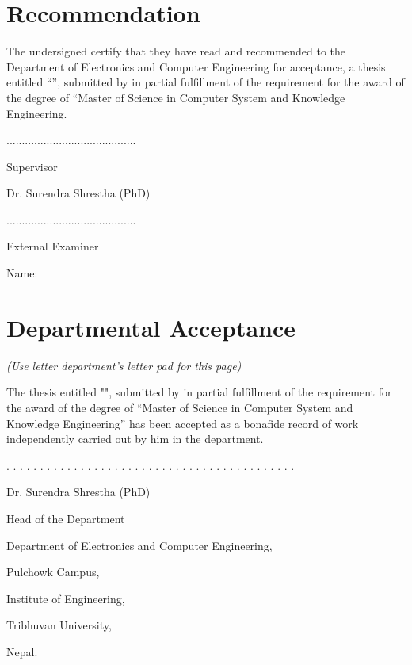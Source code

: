 \doublespacing


\chapter*{Recommendation}
\vspace{3cm}
The undersigned certify that they have read and recommended to the Department of Electronics and Computer Engineering for acceptance, a thesis entitled “\textit{\thetitle}”, submitted by \theauthor in partial fulfillment of the requirement for the award of the degree of “Master of Science in Computer System and Knowledge Engineering.

\vspace{3cm}
..........................................

Supervisor

Dr. Surendra Shrestha (PhD)

\vspace{3cm}


..........................................

External Examiner

Name:









\chapter*{Departmental Acceptance}

\textit{(Use letter department’s letter pad for this page)}
\vspace{3cm}

The thesis entitled "\thetitle", submitted by \theauthor in partial fulfillment of the requirement for the award of the degree of “Master of Science in Computer System and Knowledge Engineering” has been accepted as a bonafide record of work independently carried out by him in the department.





\vspace{3cm}
. . . . . . . . . . . . . . . . . . . . . . . . . . . . . . . . . . . . . . . . . . . 

Dr. Surendra Shrestha (PhD)

Head of the Department

Department of Electronics and Computer Engineering,

Pulchowk Campus,

Institute of Engineering,

Tribhuvan University,

Nepal.

